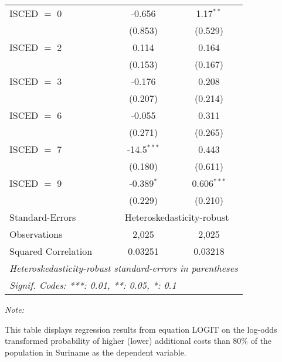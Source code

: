 \begin{table}[htbp!]
\begin{adjustbox}{width = 1\textwidth, max height = 0.95\textheight, center}
\begin{threeparttable}[b]
\begin{tabular}{lcc}
            ISCED $=$ 0          & -0.656         & 1.17$^{**}$\\   
                                 & (0.853)        & (0.529)\\   
            ISCED $=$ 2          & 0.114          & 0.164\\   
                                 & (0.153)        & (0.167)\\   
            ISCED $=$ 3          & -0.176         & 0.208\\   
                                 & (0.207)        & (0.214)\\   
            ISCED $=$ 6          & -0.055         & 0.311\\   
                                 & (0.271)        & (0.265)\\   
            ISCED $=$ 7          & -14.5$^{***}$  & 0.443\\   
                                 & (0.180)        & (0.611)\\   
            ISCED $=$ 9          & -0.389$^{*}$   & 0.606$^{***}$\\   
                                 & (0.229)        & (0.210)\\   
            \midrule 
            Standard-Errors & \multicolumn{2}{c}{Heteroskedasticity-robust} \\ 
            Observations         & 2,025          & 2,025\\  
            Squared Correlation  & 0.03251        & 0.03218\\  
            \midrule \midrule
            \multicolumn{3}{l}{\emph{Heteroskedasticity-robust standard-errors in parentheses}}\\
            \multicolumn{3}{l}{\emph{Signif. Codes: ***: 0.01, **: 0.05, *: 0.1}}\\
         \end{tabular}
         
         \begin{tablenotes}\item \medskip \textit{Note:}
            \item This table displays regression results from equation LOGIT on the log-odds transformed probability of higher (lower) additional costs than 80\% of the population in Suriname as the dependent variable. 
         \end{tablenotes}
      \end{threeparttable}
   \end{adjustbox}
\end{table}



